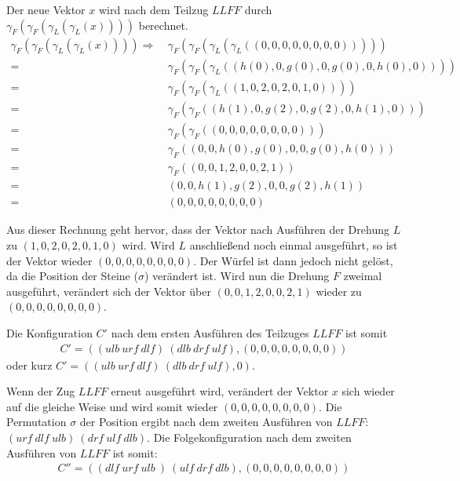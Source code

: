 \documentclass[12pt,a4paper, usenames, dvipsnames]{article}
\theoremstyle{mystyle}
\theoremstyle{definition}
\begin{document}
Der neue Vektor $x$ wird nach dem Teilzug $LLFF$ durch $\gamma_F(\gamma_F(\gamma_L(\gamma_L(x))))$ berechnet. 
\begin{align*}
 \gamma_F(\gamma_F(\gamma_L(\gamma_L(x)))) \Rightarrow \ & \gamma_F(\gamma_F(\gamma_L(\gamma_L((0,0,0,0,0,0,0,0))))) \\
= \ & \gamma_F(\gamma_F(\gamma_L((h(0),0,g(0),0,g(0),0,h(0),0)))) \\
= \ & \gamma_F(\gamma_F(\gamma_L((1,0,2,0,2,0,1,0)))) \\
= \ & \gamma_F(\gamma_F((h(1),0,g(2),0,g(2),0,h(1),0))) \\
= \ & \gamma_F(\gamma_F((0,0,0,0,0,0,0,0))) \\
= \ & \gamma_F((0,0,h(0),g(0),0,0,g(0),h(0))) \\
= \ & \gamma_F((0,0,1,2,0,0,2,1)) \\
= \ & (0,0,h(1),g(2),0,0,g(2),h(1)) \\
= \ & (0,0,0,0,0,0,0,0)
\end{align*}

Aus dieser Rechnung geht hervor, dass der Vektor nach Ausführen der Drehung $L$ zu $(1,0,2,0,2,0,1,0)$ wird. Wird $L$ anschließend noch einmal ausgeführt, so ist der Vektor wieder $(0,0,0,0,0,0,0,0)$. Der Würfel ist dann jedoch nicht gelöst, da die Position der Steine ($\sigma$) verändert ist.
Wird nun die Drehung $F$ zweimal ausgeführt, verändert sich der Vektor über $(0,0,1,2,0,0,2,1)$ wieder zu $(0,0,0,0,0,0,0,0)$. 

Die Konfiguration $C'$ nach dem ersten Ausführen des Teilzuges $LLFF$ ist somit 
\begin{align*}
C' = ((\textit{ulb} \ \textit{urf} \ \textit{dlf} )\ ( \textit{dlb} \ \textit{drf} \ \textit{ulf} ),(0,0,0,0,0,0,0,0))
\end{align*} 
oder kurz $C' = ((\textit{ulb} \ \textit{urf} \ \textit{dlf} ) \ (\textit{dlb} \ \textit{drf} \ \textit{ulf} ),0)$.

Wenn der Zug $LLFF$ erneut ausgeführt wird, verändert der Vektor $x$ sich wieder auf die gleiche Weise und wird somit wieder $(0,0,0,0,0,0,0,0)$. Die Permutation $\sigma$ der Position ergibt nach dem zweiten Ausführen von $LLFF$: $( \textit{urf} \ \textit{dlf} \ \textit{ulb} ) \ ( \textit{drf} \ \textit{ulf} \ \textit{dlb} )$. Die Folgekonfiguration nach dem zweiten Ausführen von $LLFF$ ist somit:
\begin{align*}
C'' = (( \textit{dlf} \ \textit{urf} \ \textit{ulb} \ )  \ ( \textit{ulf} \ \textit{drf} \ \textit{dlb} ),(0,0,0,0,0,0,0,0))
\end{align*} 
\end{document}
